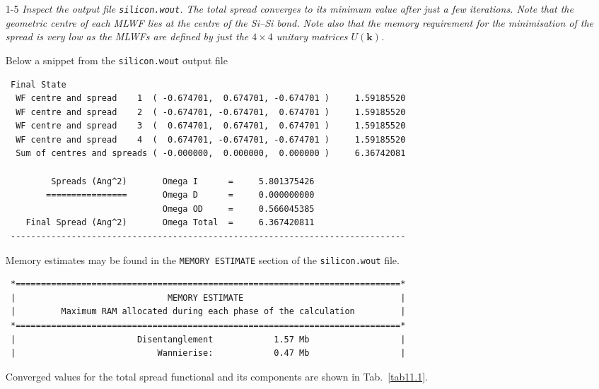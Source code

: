 \begin{itemize}
	\item[1-5] {\it Inspect the output file {\tt silicon.wout}. The total spread converges to its minimum value after just a
few iterations. Note that the geometric centre of each MLWF lies at the centre of the Si--Si bond. Note
also that the memory requirement for the minimisation of the spread is very low as the MLWFs are
defined by just the $4\times4$ unitary matrices $U(\mathbf{k})$.}

Below a snippet from the {\tt silicon.wout} output file
  \begin{tcolorbox}[sharp corners,boxrule=0.5pt]
  {\small
\begin{verbatim}
 Final State
  WF centre and spread    1  ( -0.674701,  0.674701, -0.674701 )     1.59185520
  WF centre and spread    2  ( -0.674701, -0.674701,  0.674701 )     1.59185520
  WF centre and spread    3  (  0.674701,  0.674701,  0.674701 )     1.59185520
  WF centre and spread    4  (  0.674701, -0.674701, -0.674701 )     1.59185520
  Sum of centres and spreads ( -0.000000,  0.000000,  0.000000 )     6.36742081

         Spreads (Ang^2)       Omega I      =     5.801375426
        ================       Omega D      =     0.000000000
                               Omega OD     =     0.566045385
    Final Spread (Ang^2)       Omega Total  =     6.367420811
 ------------------------------------------------------------------------------
\end{verbatim}
}
\end{tcolorbox}
Memory estimates may be found in the {\tt MEMORY ESTIMATE} section of the {\tt silicon.wout} file.
  \begin{tcolorbox}[sharp corners,boxrule=0.5pt]
  {\small
\begin{verbatim}
 *============================================================================*
 |                              MEMORY ESTIMATE                               |
 |         Maximum RAM allocated during each phase of the calculation         |
 *============================================================================*
 |                        Disentanglement            1.57 Mb                  |
 |                            Wannierise:            0.47 Mb                  |

\end{verbatim}
}
\end{tcolorbox}
Converged values for the total spread functional and its components are shown in Tab.~\ref{tab11.1}.


\end{itemize}

